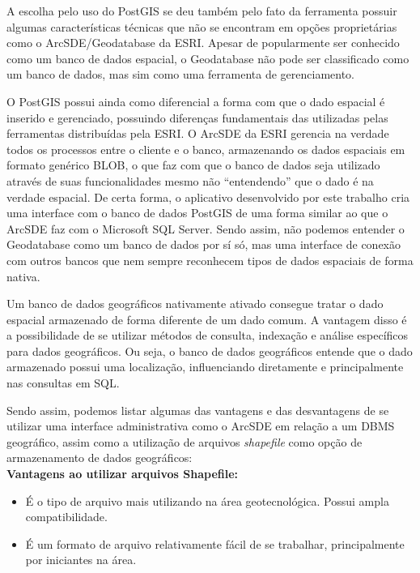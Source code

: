 A escolha pelo uso do PostGIS se deu também pelo fato da ferramenta possuir algumas características técnicas que não se encontram em opções proprietárias como o ArcSDE/Geodatabase da ESRI. Apesar de popularmente ser conhecido como um banco de dados espacial, o Geodatabase não pode ser classificado como um banco de dados, mas sim como uma ferramenta de gerenciamento.

O PostGIS possui ainda como diferencial a forma com que o dado espacial é inserido e gerenciado, possuindo diferenças fundamentais das utilizadas pelas ferramentas distribuídas pela ESRI. O ArcSDE da ESRI gerencia na verdade todos os processos entre o cliente e o banco, armazenando os dados espaciais em formato genérico BLOB, o que faz com que o banco de dados seja utilizado através de suas funcionalidades mesmo não “entendendo” que o dado é na verdade espacial. De certa forma, o aplicativo desenvolvido por este trabalho cria uma interface com o banco de dados PostGIS de uma forma similar ao que o ArcSDE faz com o Microsoft SQL Server. Sendo assim, não podemos entender o Geodatabase como um banco de dados por sí só, mas uma interface de conexão com outros bancos que nem sempre reconhecem tipos de dados espaciais de forma nativa.

Um banco de dados geográficos nativamente ativado consegue tratar o dado espacial armazenado de forma diferente de um dado comum. A vantagem disso é a possibilidade de se utilizar métodos de consulta, indexação e análise específicos para dados geográficos. Ou seja, o banco de dados geográficos entende que o dado armazenado possui uma localização, influenciando diretamente e principalmente nas consultas em SQL.

Sendo assim, podemos listar algumas das vantagens e das desvantagens de se utilizar uma interface administrativa como o ArcSDE em relação a um DBMS geográfico, assim como a utilização de arquivos \textit{shapefile} como opção de armazenamento de dados geográficos: \\

\textbf{Vantagens ao utilizar arquivos Shapefile:}

	\begin{itemize}
		\item É o tipo de arquivo mais utilizando na área geotecnológica. Possui ampla compatibilidade.
		\item É um formato de arquivo relativamente fácil de se trabalhar, principalmente por iniciantes na área.
	\end{itemize}
		
